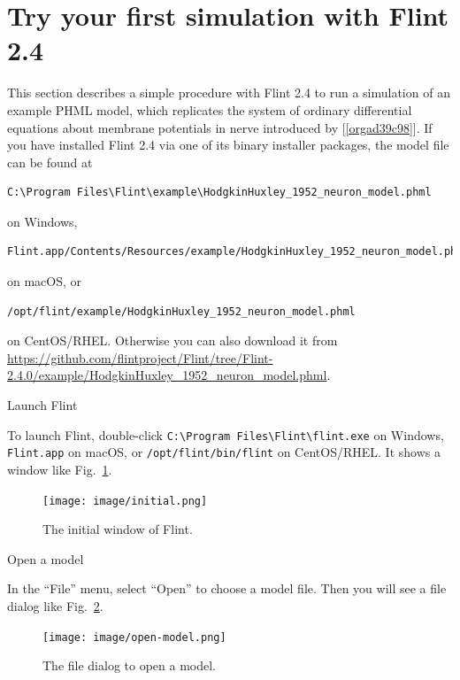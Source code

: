 \documentclass[a4paper,10pt]{report}
\begin{document}
\section{Try your first simulation with Flint 2.4}
\label{sec:org4fe4ff2}
This section describes a simple procedure with Flint 2.4 to run a simulation of an
example PHML model, which replicates the system of ordinary differential
equations about membrane potentials in nerve introduced by
[\ref{orgad39c98}].
If you have installed Flint 2.4 via one of its binary installer packages, the
model file can be found at
\begin{verbatim}
C:\Program Files\Flint\example\HodgkinHuxley_1952_neuron_model.phml
\end{verbatim}
on Windows,
\begin{verbatim}
Flint.app/Contents/Resources/example/HodgkinHuxley_1952_neuron_model.phml
\end{verbatim}
on macOS, or
\begin{verbatim}
/opt/flint/example/HodgkinHuxley_1952_neuron_model.phml
\end{verbatim}
on CentOS/RHEL.
Otherwise you can also download it from
\url{https://github.com/flintproject/Flint/tree/Flint-2.4.0/example/HodgkinHuxley\_1952\_neuron\_model.phml}.

\begin{description}
\item[{Launch Flint}] 
\end{description}
To launch Flint, double-click
\texttt{C:\textbackslash{}Program Files\textbackslash{}Flint\textbackslash{}flint.exe} on Windows,
\texttt{Flint.app} on macOS, or \texttt{/opt/flint/bin/flint} on CentOS/RHEL.
It shows a window like Fig.~\ref{fig:org0c1457a}.
\begin{figure}[htbp]
\centering
\texttt{[image: image/initial.png]}
\caption{\label{fig:org0c1457a}The initial window of Flint.}
\end{figure}

\begin{description}
\item[{Open a model}] 
\end{description}
In the ``File'' menu, select ``Open'' to choose a model file. Then you will see
a file dialog like Fig.~\ref{fig:org1138b55}.

\begin{figure}[htbp]
\centering
\texttt{[image: image/open-model.png]}
\caption{\label{fig:org1138b55}The file dialog to open a model.}
\end{figure}
\end{document}
